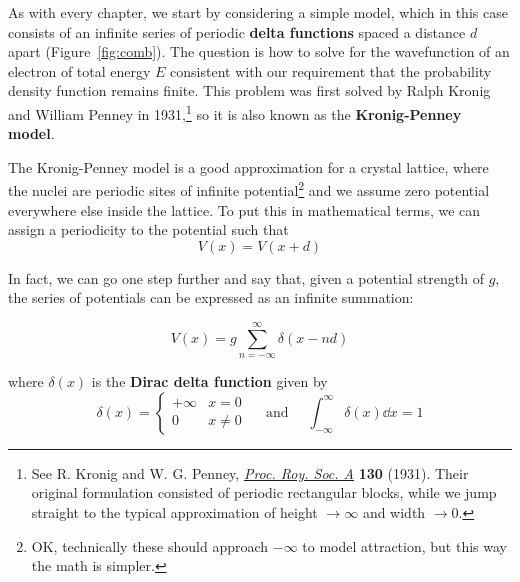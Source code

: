 As with every chapter, we start by considering a simple model, which in this case consists of an infinite series of periodic \textbf{delta functions} spaced a distance $d$ apart (Figure~\ref{fig:comb}). The question is how to solve for the wavefunction of an electron of total energy $E$ consistent with our requirement that the probability density function remains finite. This problem was first solved by Ralph Kronig and William Penney in 1931,\footnote{See R. Kronig and W. G. Penney, \href{http://rspa.royalsocietypublishing.org/content/130/814/499}{\emph{Proc. Roy. Soc. A}} \textbf{130} (1931). Their original formulation consisted of periodic rectangular blocks, while we jump straight to the typical approximation of height $\rightarrow\infty$ and width $\rightarrow0$.} so it is also known as the \textbf{Kronig-Penney model}.

The Kronig-Penney model is a good approximation for a crystal lattice, where the nuclei are periodic sites of infinite potential\footnote{OK, technically these should approach $-\infty$ to model attraction, but this way the math is simpler.} and we assume zero potential everywhere else inside the lattice. To put this in mathematical terms, we can assign a periodicity to the potential such that \begin{equation*}
	V(x) = V(x+d)
\end{equation*}

In fact, we can go one step further and say that, given a potential strength of $g$, the series of potentials can be expressed as an infinite summation:
\begin{tcolorbox}[title = Kronig-Penney model potential] \vspace{-2ex}
	\begin{equation}
	V(x) = g \sum_{n=-\infty}^{\infty} \delta(x - nd) \label{eq:kp-pot}
	\end{equation}
\end{tcolorbox}

where $\delta(x)$ is the \textbf{Dirac delta function} given by
\begin{equation*}
	\boxed{\delta(x) = \begin{cases}
		+\infty & x=0 \\ 0 & x \neq 0
	\end{cases} \quad \text{ and } \quad 
	\int_{-\infty}^{\infty} \delta(x) \dd{x} = 1}
\end{equation*}


